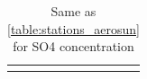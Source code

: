 \documentclass[journal abbreviation, manuscript]{copernicus}
\begin{document}
\begin{table}
\begin{tabularx}{\textwidth}{lX}
                                                                                                                                                                                                                                                                                                                                                                                                                                                                                                                                                                                                                                                                                                                                                                                                                                                                             \\
  \bottomhline
 \end{tabularx}
 \caption{Same as \ref{table:stations_aerosun} for SO4 concentration}
 \label{table:stations_so4}
\end{table}

\clearpage
\end{document}
